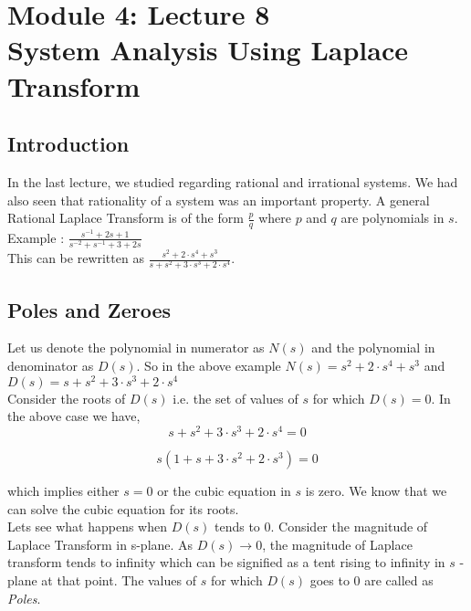 \section{Module 4: Lecture 8\\System Analysis Using Laplace Transform}


\subsection{Introduction}
\noindent
In the last lecture, we studied regarding rational and irrational systems. We had also seen that rationality of a system was an important property.
A general Rational Laplace Transform is of the form $\frac{p}{q}$ where $p$ and $q$ are polynomials in $s$.\\

\noindent
Example : $\frac{s^{-1}+2s+1}{s^{-2}+s^{-1}+3+2s}$\\

\noindent
This can be rewritten as $\frac{s^2+2\cdot s^4+s^3}{s+s^2+3\cdot s^3+2\cdot s^4}$.\\

\subsection{Poles and Zeroes}

\noindent
Let us denote the polynomial in numerator as $N(s)$ and the polynomial in denominator as $D(s)$. So in the above example $N(s) = s^2+2\cdot s^4+s^3$ and $D(s) = s+s^2+3\cdot s^3+2\cdot s^4$\\

\noindent
Consider the roots of $D(s)$ i.e. the set of values of $s$ for which $D(s) = 0$. In the above case we have,\\

$$s+s^2+3\cdot s^3+2\cdot s^4 = 0$$

$$s(1+s+3\cdot s^2+2\cdot s^3) = 0$$

\noindent
which implies either $s=0$ or the cubic equation in $s$ is zero. We know that we can solve the cubic equation for its roots.\\

\noindent
Lets see what happens when $D(s)$ tends to $0$. Consider the magnitude of Laplace Transform in s-plane. As $D(s) \rightarrow  0$, the magnitude of Laplace transform tends to infinity which can be signified as a tent rising to infinity in $s$ -plane at that point. The values of $s$ for which $D(s)$ goes to $0$ are called as \emph{Poles}.\\

